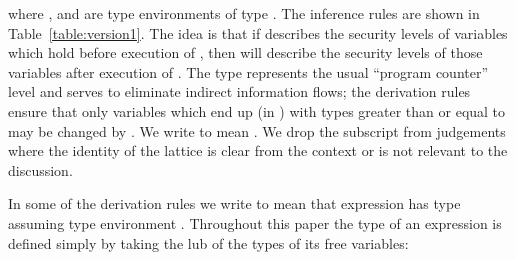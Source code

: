 \documentclass{sigplanconf}
\begin{document}
where , and  are type environments of type .
The inference rules are shown in Table~\ref{table:version1}.
The idea is that if  describes the security levels of variables which hold 
before execution of , then  will describe the security levels of those variables after execution of .
The type  represents the usual ``program counter'' level and serves to eliminate 
indirect information flows; the derivation rules ensure that only variables which end up
(in ) with types greater than or equal to  may be changed by .
We write  to mean .
We drop the  subscript from judgements where the identity of the lattice is clear
from the context or is not relevant to the discussion.

In some of the derivation rules we write  to mean that expression  has type
 assuming type environment .
Throughout this paper the type of an expression is defined simply by
taking the lub of the types of its free variables:
\end{document}
